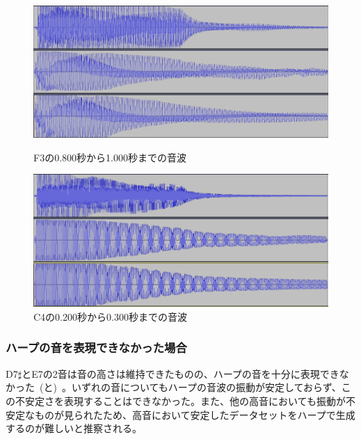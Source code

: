 \begin{figure}[b]
\centering
\begin{minipage}{0.48\columnwidth}
\centering
\includegraphics[width=0.9\columnwidth]{figure/88_88/f3.png}
\caption[F3の音波]{F3の0.800秒から1.000秒までの音波}
\label{fig:88_88_good1}
\end{minipage}
\begin{minipage}{0.48\columnwidth}
\centering
\includegraphics[width=0.9\columnwidth]{figure/88_88/c4.png}
\caption[C4の音波]{C4の0.200秒から0.300秒までの音波}
\label{fig:88_88_good2}
\end{minipage}
\end{figure}

\clearpage

\subsubsection{ハープの音を表現できなかった場合}

D7$\sharp$とE7の2音は音の高さは維持できたものの、ハープの音を十分に表現できなかった~(と)~。いずれの音についてもハープの音波の振動が安定しておらず、この不安定さを表現することはできなかった。また、他の高音においても振動が不安定なものが見られたため、高音において安定したデータセットをハープで生成するのが難しいと推察される。

